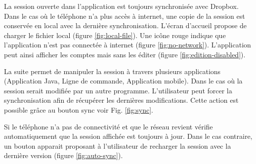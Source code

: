 La session ouverte dans l'application est toujours synchronisée avec Dropbox. Dans le cas où le téléphone n'a plus accès à internet, une copie de la session est conservée en local avec la dernière synchronisation. L'écran d'accueil propose de charger le fichier local (figure \ref{fig:local-file}). Une icône rouge indique que l'application n'est pas connectée à internet (figure \ref{fig:no-network}). L'application peut ainsi afficher les comptes mais sans les éditer (figure \ref{fig:edition-disabled}). 

\begin{center}
	\begin{minipage}{.3\textwidth}
	\end{minipage}
	\begin{minipage}{.3\textwidth}
	\end{minipage}
	\begin{minipage}{.3\textwidth}
	\end{minipage}        
\end{center}

La suite \easypass{} permet de manipuler la session à travers plusieurs applications (Application Java, Ligne de commande, Application mobile). Dans le cas où la session serait modifiée par un autre programme. L'utilisateur peut forcer la synchronisation afin de récupérer les dernières modifications. Cette action est possible grâce au bouton sync voir Fig. \ref{fig:sync}.

\begin{center}
    \begin{minipage}{.3\textwidth}
    \end{minipage}        
	\begin{minipage}{.3\textwidth}
	\end{minipage}
\end{center}

Si le téléphone n'a pas de connectivité et que le réseau revient \easypass{} vérifie automatiquement que la session affichée est toujours à jour. Dans le cas contraire, un bouton apparait proposant à l'utilisateur de recharger la session avec la dernière version (figure \ref{fig:auto-sync}).

